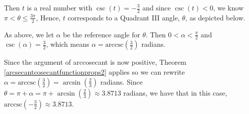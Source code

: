 \documentclass{ximera}
\begin{document}
\begin{example}
\begin{explanation}
\begin{enumerate}
\begin{enumerate}
 

Then $t$ is a real number with $\csc(t) = -\frac{3}{2}$ and since $\csc(t) < 0$, we know $\pi < \theta \leq \frac{3\pi}{2}$,   Hence,  $t$ corresponds to a Quadrant III angle, $\theta$, as depicted below. 

 

As above, we let $\alpha$ be the reference angle for $\theta$.  Then $0 < \alpha < \frac{\pi}{2}$ and $\csc(\alpha) =\frac{3}{2}$, which means $\alpha = \text{arccsc}\left(\frac{3}{2}\right)$ radians.  

 

Since the argument of arccosecant is now positive, Theorem \ref{arcsecantcosecantfunctionprops2}  applies so we can rewrite $\alpha = \text{arccsc}\left(\frac{3}{2}\right) = \arcsin\left(\frac{2}{3}\right)$ radians.  Since $\theta = \pi + \alpha = \pi +  \arcsin\left(\frac{2}{3}\right) \approx 3.8713$ radians,  we have that in this case,  $\text{arccsc}\left(-\frac{3}{2}\right) \approx 3.8713$.

\begin{image}
\end{image}
\end{enumerate}
\end{enumerate}
\end{explanation}
\end{example}
\end{document}
